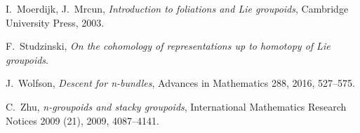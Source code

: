 \begin{thebibliography}{9}
I.~Moerdijk, J.~Mrcun, \textit{Introduction to foliations and Lie groupoids}, Cambridge University Press, 2003.

F.~Studzinski, \textit{On the cohomology of representations up to homotopy of Lie groupoids}.

J.~Wolfson, \textit{Descent for n-bundles}, Advances in Mathematics 288, 2016, 527--575.

C.~Zhu, \textit{n-groupoids and stacky groupoids}, International Mathematics Research Notices 2009 (21), 2009, 4087--4141.


\end{thebibliography}
